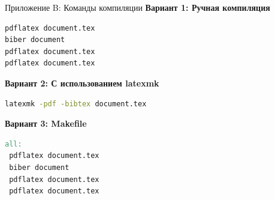 \documentclass[aspectratio=169, 12pt]{beamer}
\begin{document}
\begin{frame}[fragile]{Приложение B: Команды компиляции}
  \textbf{Вариант 1: Ручная компиляция}
  \begin{lstlisting}[language=bash, basicstyle=\ttfamily\small]
pdflatex document.tex
biber document
pdflatex document.tex
pdflatex document.tex
  \end{lstlisting}
  
  \vspace{0.5cm}
  
  \textbf{Вариант 2: С использованием latexmk}
  \begin{lstlisting}[language=bash, basicstyle=\ttfamily\small]
latexmk -pdf -bibtex document.tex
  \end{lstlisting}
  
  \vspace{0.5cm}
  
  \textbf{Вариант 3: Makefile}
  \begin{lstlisting}[language=make, basicstyle=\ttfamily\small]
all:
 pdflatex document.tex
 biber document
 pdflatex document.tex
 pdflatex document.tex
  \end{lstlisting}
\end{frame}
\end{document}
